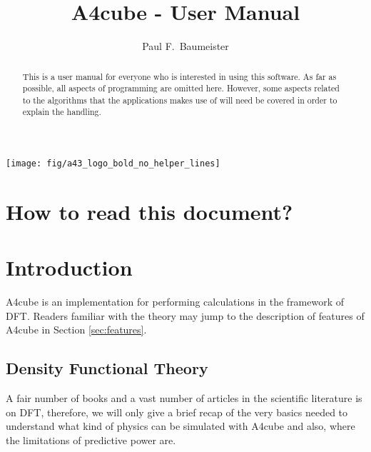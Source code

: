 \documentclass[oribibl]{llncs}
\newcommand{\codename}{A4cube}
\begin{document}
\pagestyle{plain}

\title       {\codename{} - User Manual}
\titlerunning{\codename{}}

\author{%
  Paul F.~Baumeister %
}


\maketitle

\begin{figure*}
	\centering
	\texttt{[image: fig/a43\_logo\_bold\_no\_helper\_lines]} %
\end{figure*}

\begin{abstract}
This is a user manual for everyone who is interested in using
this software.
As far as possible, all aspects of programming are omitted here.
However, some aspects related to the algorithms that the applications 
makes use of will need be covered in order to explain the handling.
\end{abstract}

\section*{How to read this document?}

\newpage
\section{Introduction} \label{sec:intro}
%
\codename{} is an implementation for performing calculations 
in the framework of \ac{DFT}.
Readers familiar with the theory may jump to the description of 
features of \codename{} in Section \ref{sec:features}.

\subsection{Density Functional Theory} \label{sec:short-theory}
%
A fair number of books and a vast number of articles in the scientific 
literature is on \ac{DFT}, therefore, we will only give a brief recap 
of the very basics needed to understand what kind of physics can be
simulated with \codename{} and also, where the limitations of predictive power
are.
\end{document}
